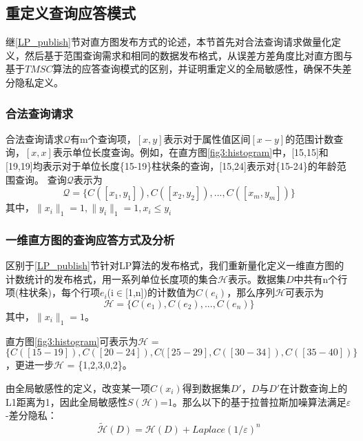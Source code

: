 \subsection{重定义查询应答模式}

继\ref{LP_publish}节对直方图发布方式的论述，本节首先对合法查询请求做量化定义，然后基于范围查询需求和相同的数据发布格式，从误差方差角度比对直方图与基于$TMSC$算法的应答查询模式的区别，并证明重定义的全局敏感性，确保不失差分隐私定义。

\subsubsection{合法查询请求}

合法查询请求$\mathcal{Q}$有m个查询项，$[x,y]$表示对于属性值区间$[x-y]$的范围计数查询，$[x,x]$表示单位长度查询。例如，在直方图\ref{fig3:histogram}中，[15,15]和[19,19]均表示对于单位长度\{15-19\}柱状条的查询，[15,24]表示对\{15-24\}的年龄范围查询。
查询$\mathcal{Q}$表示为
\[
\mathcal{Q} = \{C([x_{1},y_{1}]),C([x_{2},y_{2}]),...,C([x_{m},y_{m}])\}
\]
其中，$\|x_{i}\|_{1} = 1, \|y_{i}\|_{1} = 1, x_{i} \leqslant y_{i}$

\subsubsection{一维直方图的查询应答方式及分析}

区别于\ref{LP_publish}节针对LP算法\supercite{Dwork Calibrating}的发布格式，我们重新量化定义一维直方图的计数统计的发布格式，用一系列单位长度项的集合$\mathcal{H}$表示。数据集$D$中共有n个行项(柱状条)，每个行项$e_{i}$(i$\in$[1,n])的计数值为$C(e_{i})$，那么序列$\mathcal{H}$可表示为
\begin{equation*}
	\mathcal{H} = \{C(e_{1}),C(e_{2}),...,C(e_{n})\}
\end{equation*}
其中，$\|x_{i}\|_{1} = 1$。

\begin{exmp}
	\label{chap4_exmp}
	直方图\ref{fig3:histogram}可表示为$\mathcal{H}$ = $\{C([15-19]),C([20-24]),C([25-29],C([30-34]),C([35-40])\}$，更进一步$\mathcal{H}$ = \{1,2,3,0,2\}。
\end{exmp}

由全局敏感性的定义，改变某一项$C(x_{i})$得到数据集$D'$，$D$与$D'$在计数查询上的L1距离为1，因此全局敏感性$S(\mathcal{H})$=1。那么以下的基于拉普拉斯加噪算法满足$\varepsilon$-差分隐私：
\begin{equation}
	\label{chap4_lap}
	\tilde{\mathcal{H}}(D) = \mathcal{H}(D) + \textit{Laplace}(1/\varepsilon)^n
\end{equation}

